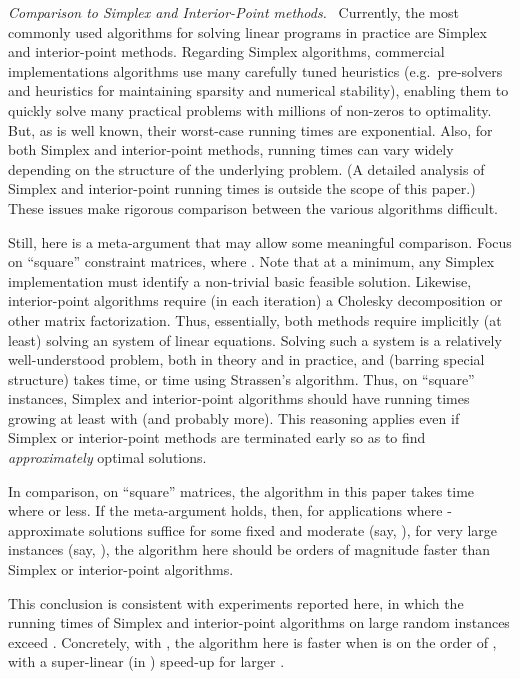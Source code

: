 \documentclass[11pt]{svjour3} \usepackage{fullpage}
\renewcommand{\paragraph}[1]{\smallskip\vspace{2pt}\par{\em #1}~}
\begin{document}
\paragraph{Comparison to Simplex and Interior-Point methods.}
Currently, the most commonly used algorithms for solving linear programs in practice are Simplex and interior-point methods.  Regarding Simplex algorithms, commercial implementations algorithms use many carefully tuned heuristics (e.g.~pre-solvers and heuristics for maintaining sparsity and numerical stability), enabling them to quickly solve many practical problems with millions of non-zeros to optimality.  But, as is well known, 
their worst-case running times are exponential.
Also, for both Simplex and interior-point methods,
running times can vary widely depending on the structure of the underlying problem.
(A detailed analysis of Simplex and interior-point running times is outside the scope of this paper.)
These issues make rigorous comparison between the various algorithms difficult.

Still, here is a meta-argument that may allow some meaningful comparison. Focus on ``square'' constraint matrices, where .   Note that at a minimum, any Simplex implementation must identify a non-trivial basic feasible solution.  Likewise, interior-point algorithms require (in each iteration) a Cholesky decomposition or other matrix factorization.  Thus, essentially, both methods require implicitly (at least) solving an  system of linear equations.  Solving such a system is a relatively well-understood problem, both in theory and in practice, and (barring special structure) takes  time, or  time using Strassen's algorithm.  Thus, on ``square'' instances, Simplex and interior-point algorithms should have running times growing at least with  (and probably more).
This reasoning applies even if Simplex or interior-point methods are terminated early so as to find {\em approximately} optimal solutions.  

In comparison, on ``square'' matrices, the algorithm in this paper takes time  where  or less.  
If the meta-argument holds, 
then, for applications where -approximate solutions suffice
for some fixed and moderate  (say, ),
for very large instances (say, ),
the algorithm here should be orders of magnitude faster than Simplex
or interior-point algorithms.

This conclusion is consistent with experiments reported here, in which the running times of Simplex and interior-point algorithms on large random instances exceed .  Concretely, with , the algorithm here is faster when  is on the order of , with a super-linear (in ) speed-up for larger .
\end{document}

